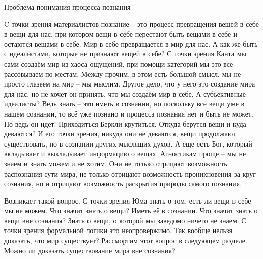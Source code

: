 Проблема понимания процесса познания

C точки зрения материалистов познание – это процесс превращения вещей в себе в вещи для нас, при котором вещи в себе перестают быть вещами в себе и остаются вещами в себе. Мир в себе превращается в мир для нас. А как же быть с идеалистами, которые не признают вещей в себе? С точки зрения Канта мы сами создаём мир из хаоса ощущений, при помощи категорий мы это всё рассовываем по местам. Между прочим, в этом есть большой смысл, мы не просто глазеем на мир – мы мыслим. Другое дело, что у него это создание мира для нас, но не хочет он принять, что мы создаём мир в себе. А субъективные идеалисты? Ведь знать – это иметь в сознании, но поскольку все вещи уже в нашем сознании, то всё уже познано и процесса познания нет и быть не может. Но ведь он идет! Приходиться Беркли крутиться. Откуда берутся вещи и куда деваются? И его точки зрения, никуда они не деваются, вещи продолжают существовать, но в сознании других мыслящих духов. А еще есть Бог, который вкладывает и выкладывает информацию о вещах. Агностикам проще – мы не знаем и знать можем и не хотим. Они не только отрицают возможность распознания сути мира, не только отрицают возможность проникновения за круг сознания, но и отрицают возможность раскрытия природы самого познания.

Возникает такой вопрос. С точки зрения Юма знать о том, есть ли вещи в себе мы не можем. Что значит знать о вещи? Иметь её в сознании. Что значит знать о вещи вне сознания? Знать о вещи, о которой мы заведомо ничего не знаем. С точки зрения формальной логики это неопровержимо. Так вообще нельзя доказать, что мир существует? Рассмортим этот вопрос в следующем разделе.
Можно ли доказать существование мира вне сознания?

